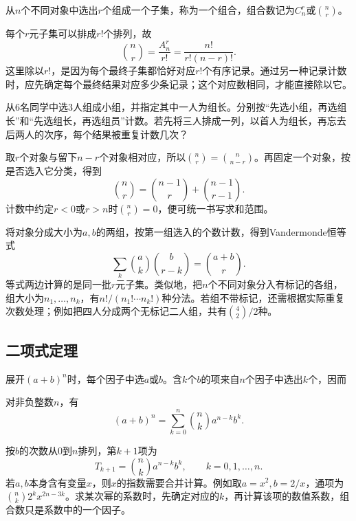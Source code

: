 \begin{definition}
从\(n\)个不同对象中选出\(r\)个组成一个子集，称为一个{\heiti 组合}，组合数记为\(C_n^r\)或\(\binom nr\)。
\end{definition}

每个\(r\)元子集可以排成\(r!\)个排列，故
\begin{equation}\label{eq:prob-combinations}
 \binom nr=\frac{A_n^r}{r!}=\frac{n!}{r!(n-r)!}.
\end{equation}
这里除以\(r!\)，是因为每个最终子集都恰好对应\(r!\)个有序记录。通过另一种记录计数时，应先确定每个最终结果对应多少条记录；这个对应数相同，才能直接除以它。

\begin{example}
从6名同学中选3人组成小组，并指定其中一人为组长。分别按“先选小组，再选组长”和“先选组长，再选组员”计数。若先将三人排成一列，以首人为组长，再忘去后两人的次序，每个结果被重复计数几次？
\end{example}

取\(r\)个对象与留下\(n-r\)个对象相对应，所以\(\binom nr=\binom n{n-r}\)。再固定一个对象，按是否选入它分类，得到
\[
 \binom nr=\binom{n-1}{r}+\binom{n-1}{r-1}.
\]
计数中约定\(r<0\)或\(r>n\)时\(\binom nr=0\)，便可统一书写求和范围。

将对象分成大小为\(a,b\)的两组，按第一组选入的个数计数，得到{\heiti Vandermonde恒等式}
\begin{equation}\label{eq:prob-vandermonde}
 \sum_k\binom ak\binom b{r-k}=\binom{a+b}r.
\end{equation}
等式两边计算的是同一批\(r\)元子集。类似地，把\(n\)个不同对象分入有标记的各组，组大小为\(n_1,\ldots,n_k\)，有\(n!/(n_1!\cdots n_k!)\)种分法。若组不带标记，还需根据实际重复次数处理；例如把四人分成两个无标记二人组，共有\(\binom42/2\)种。

\subsection{二项式定理}

展开\((a+b)^n\)时，每个因子中选\(a\)或\(b\)。含\(k\)个\(b\)的项来自\(n\)个因子中选出\(k\)个，因而
\begin{theorem}[二项式定理]
对非负整数\(n\)，有
\begin{equation}\label{eq:prob-binomial-theorem}
 (a+b)^n=\sum_{k=0}^n\binom nk a^{n-k}b^k.
\end{equation}
\end{theorem}

按\(b\)的次数从0到\(n\)排列，第\(k+1\)项为
\[
 T_{k+1}=\binom nk a^{n-k}b^k,\qquad k=0,1,\ldots,n.
\]
若\(a,b\)本身含有变量\(x\)，则\(x\)的指数需要合并计算。例如取\(a=x^2,b=2/x\)，通项为\(\binom nk2^kx^{2n-3k}\)。求某次幂的系数时，先确定对应的\(k\)，再计算该项的数值系数，组合数只是系数中的一个因子。

